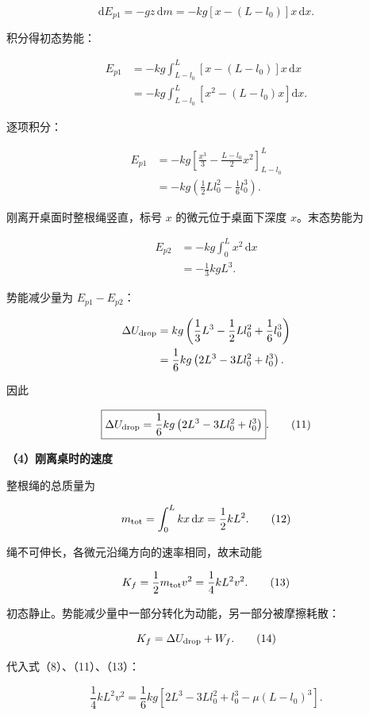 \documentclass[12pt,a4paper,UTF8]{ctexart}
\begin{document}
\[
\mathrm dE_{p1}
=-gz\,\mathrm dm
=-kg[x-(L-l_0)]x\,\mathrm dx.
\]

积分得初态势能：

\[
\begin{aligned}
E_{p1}
&=-kg\int_{L-l_0}^{L}
[x-(L-l_0)]x\,\mathrm dx\\
&=-kg\int_{L-l_0}^{L}
\left[x^2-(L-l_0)x\right]\mathrm dx.
\end{aligned}
\]

逐项积分：

\[
\begin{aligned}
E_{p1}
&=-kg\left[
\frac{x^3}{3}-\frac{L-l_0}{2}x^2
\right]_{L-l_0}^{L}\\
&=-kg\left(\frac12Ll_0^2-\frac16l_0^3\right).
\end{aligned}
\tag{9}
\]

刚离开桌面时整根绳竖直，标号 \(x\) 的微元位于桌面下深度
\(x\)。末态势能为

\[
\begin{aligned}
E_{p2}
&=-kg\int_0^Lx^2\,\mathrm dx\\
&=-\frac13kgL^3.
\end{aligned}
\tag{10}
\]

势能减少量为 \(E_{p1}-E_{p2}\)：

\[
\begin{aligned}
\Delta U_{\rm drop}
&=kg\left(
\frac13L^3-\frac12Ll_0^2+\frac16l_0^3
\right)\\
&=\frac16kg
\left(2L^3-3Ll_0^2+l_0^3\right).
\end{aligned}
\]

因此

\[
\boxed{\Delta U_{\rm drop}
=\frac16kg
\left(2L^3-3Ll_0^2+l_0^3\right)}.
\tag{11}
\]

\textbf{（4）刚离桌时的速度}

整根绳的总质量为

\[
m_{\rm tot}
=\int_0^Lkx\,\mathrm dx
=\frac12kL^2.
\tag{12}
\]

绳不可伸长，各微元沿绳方向的速率相同，故末动能

\[
K_f
=\frac12m_{\rm tot}v^2
=\frac14kL^2v^2.
\tag{13}
\]

初态静止。势能减少量中一部分转化为动能，另一部分被摩擦耗散：

\[
K_f=\Delta U_{\rm drop}+W_f.
\tag{14}
\]

代入式（8）、（11）、（13）：

\[
\frac14kL^2v^2
=\frac16kg
\left[
2L^3-3Ll_0^2+l_0^3-\mu(L-l_0)^3
\right].
\]
\end{document}
